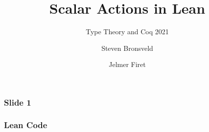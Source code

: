 \documentclass{beamer}
\author{Steven Bronsveld \and Jelmer Firet}
\title{Scalar Actions in Lean}
\subtitle{Type Theory and Coq 2021}
\institute[Radboud University Nijmegen]{Radboud University Nijmegen}
\begin{document}
	\begin{frame}[t]
	\titlepage
	\end{frame}

	\begin{frame}[t]
	\frametitle{Slide 1}
		
	\end{frame}

	\begin{frame}[t, fragile]
	\frametitle{Lean Code}
		
	\end{frame}
\end{document}
